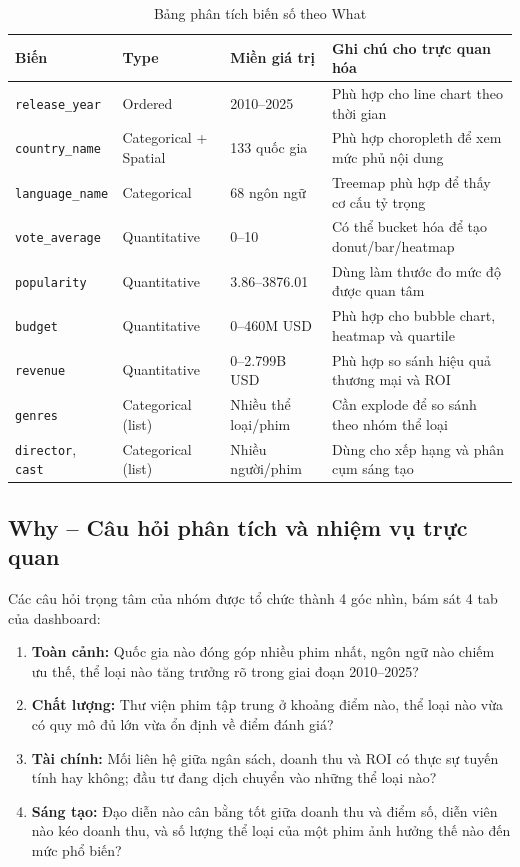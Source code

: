 \begin{table}[H]
\centering
\renewcommand{\arraystretch}{1.3}
\begin{tabularx}{\textwidth}{|p{3.4cm}|p{2.8cm}|p{3cm}|X|}
\hline
\textbf{Biến} & \textbf{Type} & \textbf{Miền giá trị} & \textbf{Ghi chú cho trực quan hóa} \\
\hline
\texttt{release\_year} & Ordered & 2010--2025 & Phù hợp cho line chart theo thời gian \\
\hline
\texttt{country\_name} & Categorical + Spatial & 133 quốc gia & Phù hợp choropleth để xem mức phủ nội dung \\
\hline
\texttt{language\_name} & Categorical & 68 ngôn ngữ & Treemap phù hợp để thấy cơ cấu tỷ trọng \\
\hline
\texttt{vote\_average} & Quantitative & 0--10 & Có thể bucket hóa để tạo donut/bar/heatmap \\
\hline
\texttt{popularity} & Quantitative & 3.86--3876.01 & Dùng làm thước đo mức độ được quan tâm \\
\hline
\texttt{budget} & Quantitative & 0--460M USD & Phù hợp cho bubble chart, heatmap và quartile \\
\hline
\texttt{revenue} & Quantitative & 0--2.799B USD & Phù hợp so sánh hiệu quả thương mại và ROI \\
\hline
\texttt{genres} & Categorical (list) & Nhiều thể loại/phim & Cần explode để so sánh theo nhóm thể loại \\
\hline
\texttt{director}, \texttt{cast} & Categorical (list) & Nhiều người/phim & Dùng cho xếp hạng và phân cụm sáng tạo \\
\hline
\end{tabularx}
\caption{Bảng phân tích biến số theo What}
\end{table}

\subsection{Why -- Câu hỏi phân tích và nhiệm vụ trực quan}
Các câu hỏi trọng tâm của nhóm được tổ chức thành 4 góc nhìn, bám sát 4 tab của dashboard:
\begin{enumerate}[leftmargin=2em]
    \item \textbf{Toàn cảnh:} Quốc gia nào đóng góp nhiều phim nhất, ngôn ngữ nào chiếm ưu thế, thể loại nào tăng trưởng rõ trong giai đoạn 2010--2025?
    \item \textbf{Chất lượng:} Thư viện phim tập trung ở khoảng điểm nào, thể loại nào vừa có quy mô đủ lớn vừa ổn định về điểm đánh giá?
    \item \textbf{Tài chính:} Mối liên hệ giữa ngân sách, doanh thu và ROI có thực sự tuyến tính hay không; đầu tư đang dịch chuyển vào những thể loại nào?
    \item \textbf{Sáng tạo:} Đạo diễn nào cân bằng tốt giữa doanh thu và điểm số, diễn viên nào kéo doanh thu, và số lượng thể loại của một phim ảnh hưởng thế nào đến mức phổ biến?
\end{enumerate}

